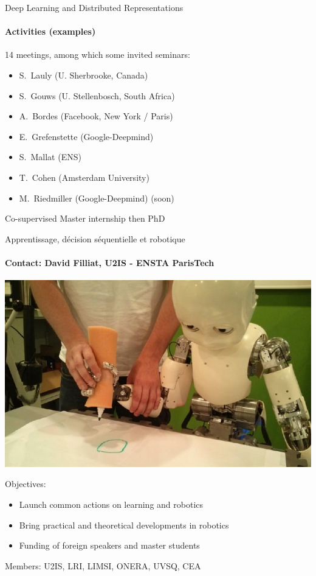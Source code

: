 \begin{frame}{Deep Learning and Distributed Representations}
\framesubtitle{Activities (examples)}

14 meetings, among which some invited seminars:
\begin{itemize}
\item S.\ Lauly (U. Sherbrooke, Canada)
\item S.\ Gouws (U. Stellenbosch, South Africa)
\item A.\ Bordes (Facebook, New York / Paris)
\item E.\ Grefenstette (Google-Deepmind)
\item S.\ Mallat (ENS)
\item T.\ Cohen (Amsterdam University)
\item M.\ Riedmiller (Google-Deepmind) (soon)
\end{itemize}
\bigskip

Co-supervised Master internship then PhD

\end{frame}


\begin{frame}{Apprentissage, décision séquentielle et robotique }
\framesubtitle{Contact: David Filliat, U2IS - ENSTA ParisTech}

\begin{minipage}[c]{.4\linewidth}
\includegraphics[width=\linewidth]{Images/robotique1.png}
\end{minipage} 
\hfill
\begin{minipage}[c]{.55\linewidth}
Objectives:
\begin{itemize}
\item Launch common actions on learning and robotics
\item Bring practical and  theoretical developments  in robotics
\item Funding of foreign speakers and master students
\end{itemize}
Members: U2IS,	LRI,	LIMSI,	ONERA,	UVSQ,	CEA	
\end{minipage} 
\end{frame}

